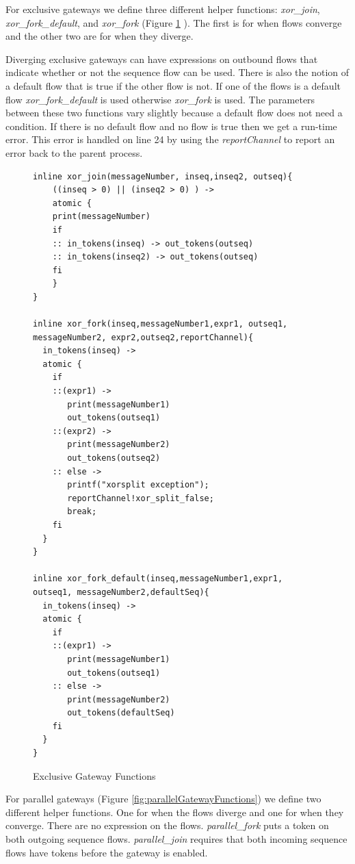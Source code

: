 \documentclass[11pt,twocolumn]{article}
\begin{document}
For exclusive gateways we define three different helper functions: \emph{xor\_join}, \emph{xor\_fork\_default}, and \emph{xor\_fork}   (Figure \ref{fig:exclusiveGatewayFunctions} ). The first is for when flows converge and the other two are for when they diverge. 

Diverging exclusive gateways can have expressions on outbound flows that indicate whether or not the sequence flow can be used. There is also the notion of a default flow that is true if the other flow is not. If one of the flows is a default flow \emph{xor\_fork\_default} is used otherwise \emph{xor\_fork} is used. The parameters between these two functions vary slightly because a default flow does not need a condition. If there is no default flow and no flow is true then we get a run-time error. This error is handled on line 24 by using the \emph{reportChannel} to report an error back to the parent process.


\begin{figure}
\begin{lstlisting}
inline xor_join(messageNumber, inseq,inseq2, outseq){
	((inseq > 0) || (inseq2 > 0) ) ->
	atomic {
	print(messageNumber)
	if 
	:: in_tokens(inseq) -> out_tokens(outseq)
	:: in_tokens(inseq2) -> out_tokens(outseq)
	fi
	}
}

inline xor_fork(inseq,messageNumber1,expr1, outseq1, messageNumber2, expr2,outseq2,reportChannel){
  in_tokens(inseq) ->
  atomic {
	if
	::(expr1) ->
	   print(messageNumber1)
	   out_tokens(outseq1)
	::(expr2) ->
	   print(messageNumber2)
	   out_tokens(outseq2)
	:: else ->
	   printf("xorsplit exception");
	   reportChannel!xor_split_false;
	   break;
	fi
  }
}

inline xor_fork_default(inseq,messageNumber1,expr1, outseq1, messageNumber2,defaultSeq){
  in_tokens(inseq) ->
  atomic {
	if
	::(expr1) ->
	   print(messageNumber1)
	   out_tokens(outseq1)
	:: else ->
	   print(messageNumber2)
	   out_tokens(defaultSeq)
	fi
  }
}
\end{lstlisting}

\caption{Exclusive Gateway Functions}
 \label{fig:exclusiveGatewayFunctions}
\end{figure}


For parallel gateways (Figure \ref{fig:parallelGatewayFunctions}) we define two different helper functions. One for when the flows diverge and one for when they converge. There are no expression on the flows. \emph{parallel\_fork} puts a token on both outgoing sequence flows. \emph{parallel\_join} requires that both incoming sequence flows have tokens before the gateway is enabled.
\end{document}
